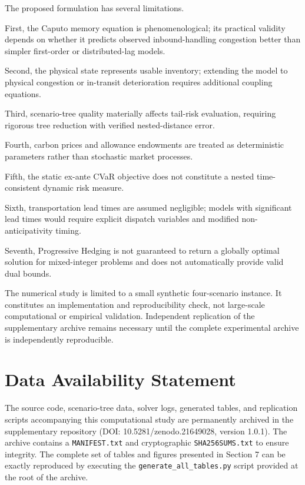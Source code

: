 \documentclass[11pt,a4paper]{article}
\begin{document}
The proposed formulation has several limitations.

First, the Caputo memory equation is phenomenological; its practical
validity depends on whether it predicts observed inbound-handling
congestion better than simpler first-order or distributed-lag models.

Second, the physical state represents usable inventory; extending the
model to physical congestion or in-transit deterioration requires
additional coupling equations.

Third, scenario-tree quality materially affects tail-risk evaluation,
requiring rigorous tree reduction with verified nested-distance error.

Fourth, carbon prices and allowance endowments are treated as
deterministic parameters rather than stochastic market processes.

Fifth, the static ex-ante CVaR objective does not constitute a nested
time-consistent dynamic risk measure.

Sixth, transportation lead times are assumed negligible; models with
significant lead times would require explicit dispatch variables and
modified non-anticipativity timing.

Seventh, Progressive Hedging is not guaranteed to return a globally
optimal solution for mixed-integer problems and does not automatically
provide valid dual bounds.

The numerical study is limited to a small synthetic four-scenario instance. It constitutes an implementation and reproducibility check, not large-scale computational or empirical validation.
Independent replication of the supplementary archive remains necessary until the complete experimental
archive is independently reproducible.

\section{Data Availability Statement}
The source code, scenario-tree data, solver logs, generated tables, and replication scripts accompanying this computational study are permanently archived in the supplementary repository (DOI: 10.5281/zenodo.21649028, version 1.0.1). The archive contains a \texttt{MANIFEST.txt} and cryptographic \texttt{SHA256SUMS.txt} to ensure integrity. The complete set of tables and figures presented in Section 7 can be exactly reproduced by executing the \texttt{generate\_all\_tables.py} script provided at the root of the archive.
\end{document}

